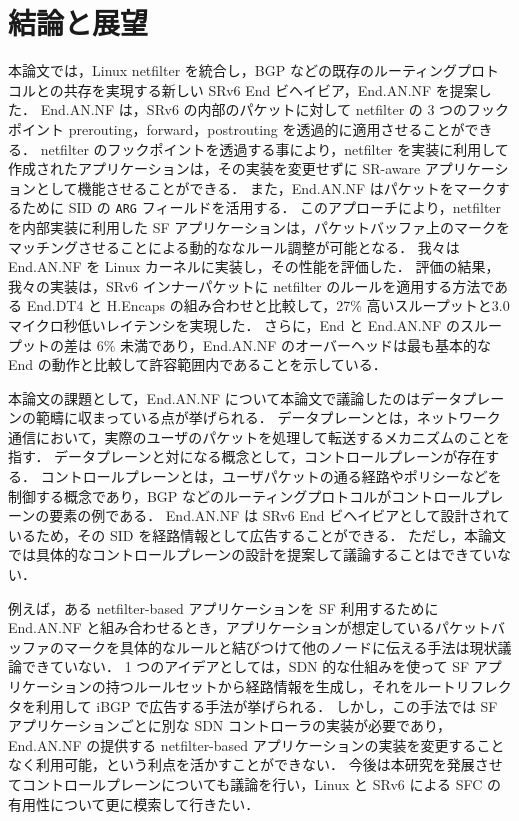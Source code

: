 \chapter{結論と展望}
\label{chap:conclusion}
本論文では，Linux netfilter を統合し，BGP などの既存のルーティングプロトコルとの共存を実現する新しい SRv6 End ビヘイビア，End.AN.NF を提案した．
End.AN.NF は，SRv6 の内部のパケットに対して netfilter の 3 つのフックポイント prerouting，forward，postrouting を透過的に適用させることができる．
netfilter のフックポイントを透過する事により，netfilter を実装に利用して作成されたアプリケーションは，その実装を変更せずに SR-aware アプリケーションとして機能させることができる．
また，End.AN.NF はパケットをマークするために SID の \texttt{ARG} フィールドを活用する．
このアプローチにより，netfilter を内部実装に利用した SF アプリケーションは，パケットバッファ上のマークをマッチングさせることによる動的ななルール調整が可能となる．
我々は End.AN.NF を Linux カーネルに実装し，その性能を評価した．
評価の結果，我々の実装は，SRv6 インナーパケットに netfilter のルールを適用する方法である End.DT4 と H.Encaps の組み合わせと比較して，27\% 高いスループットと3.0マイクロ秒低いレイテンシを実現した．
さらに，End と End.AN.NF のスループットの差は 6\% 未満であり，End.AN.NF のオーバーヘッドは最も基本的な End の動作と比較して許容範囲内であることを示している．

本論文の課題として，End.AN.NF について本論文で議論したのはデータプレーンの範疇に収まっている点が挙げられる．
データプレーンとは，ネットワーク通信において，実際のユーザのパケットを処理して転送するメカニズムのことを指す．
データプレーンと対になる概念として，コントロールプレーンが存在する．
コントロールプレーンとは，ユーザパケットの通る経路やポリシーなどを制御する概念であり，BGP などのルーティングプロトコルがコントロールプレーンの要素の例である．
End.AN.NF は SRv6 End ビヘイビアとして設計されているため，その SID を経路情報として広告することができる．
ただし，本論文では具体的なコントロールプレーンの設計を提案して議論することはできていない．

例えば，ある netfilter-based アプリケーションを SF 利用するために End.AN.NF と組み合わせるとき，アプリケーションが想定しているパケットバッファのマークを具体的なルールと結びつけて他のノードに伝える手法は現状議論できていない．
1 つのアイデアとしては，SDN 的な仕組みを使って SF アプリケーションの持つルールセットから経路情報を生成し，それをルートリフレクタを利用して iBGP で広告する手法が挙げられる．
しかし，この手法では SF アプリケーションごとに別な SDN コントローラの実装が必要であり，End.AN.NF の提供する netfilter-based アプリケーションの実装を変更することなく利用可能，という利点を活かすことができない．
今後は本研究を発展させてコントロールプレーンについても議論を行い，Linux と SRv6 による SFC の有用性について更に模索して行きたい．